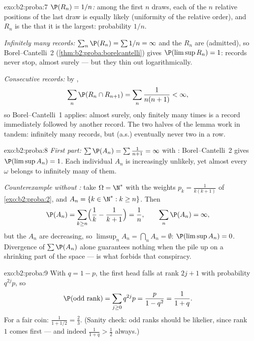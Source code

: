 \begin{solution}{exo:b2:proba:7}
\emph{$\P(R_n) = 1/n$:} among the first $n$ draws, each of the $n$
relative positions of the last draw is equally likely (uniformity
of the relative order), and $R_n$ is the  that it is the
largest: probability $1/n$.

\emph{Infinitely many records:} $\sum_n \P(R_n) = \sum 1/n =
\infty$ and the $R_n$ are  (admitted), so
Borel--Cantelli~2 (\cref{thm:b2:proba:borelcantelli}) gives
$\P(\limsup R_n) = 1$: records never stop, almost surely --- but
they thin out logarithmically.

\emph{Consecutive records:} by ,
\[
\sum_n \P(R_n \cap R_{n+1})
= \sum_n \frac{1}{n(n+1)} < \infty ,
\]
so Borel--Cantelli~1 applies: almost surely, only finitely many
times is a record immediately followed by another record. The two
halves of the lemma work in tandem: infinitely many records, but
(a.s.) eventually never two in a row.
\end{solution}

\begin{solution}{exo:b2:proba:8}
\emph{First part:} $\sum \P(A_n) = \sum\frac{1}{n+1} = \infty$
with : Borel--Cantelli~2 gives $\P(\limsup A_n) = 1$.
Each individual $A_n$ is increasingly unlikely, yet almost every
$\omega$ belongs to infinitely many of them.

\emph{Counterexample without :} take $\Omega = \N^*$
with the weights $p_k = \frac{1}{k(k+1)}$ of
\cref{exo:b2:proba:2}, and $A_n = \{k \in \N^* : k \geq n\}$.
Then
\[
\P(A_n) = \sum_{k \geq n}\Bigl(\frac1k - \frac1{k+1}\Bigr)
= \frac1n ,
\qquad
\sum_n \P(A_n) = \infty ,
\]
but the $A_n$ are decreasing, so $\limsup_n A_n = \bigcap_n A_n =
\emptyset$: $\P(\limsup A_n) = 0$. Divergence of $\sum\P(A_n)$
alone guarantees nothing when the  pile up on a shrinking
part of the space ---  is what forbids that
conspiracy.
\end{solution}

\begin{solution}{exo:b2:proba:9}
With $q = 1 - p$, the first head falls at rank $2j + 1$ with
probability $q^{2j}p$, so
\[
\P(\text{odd rank}) = \sum_{j\geq0}q^{2j}p
= \frac{p}{1 - q^2} = \frac{1}{1 + q} .
\]
For a fair coin: $\frac1{1 + 1/2} = \frac23$. (Sanity check:
odd ranks should be likelier, since rank $1$ comes first ---
and indeed $\frac1{1+q} > \frac12$ always.)
\end{solution}

